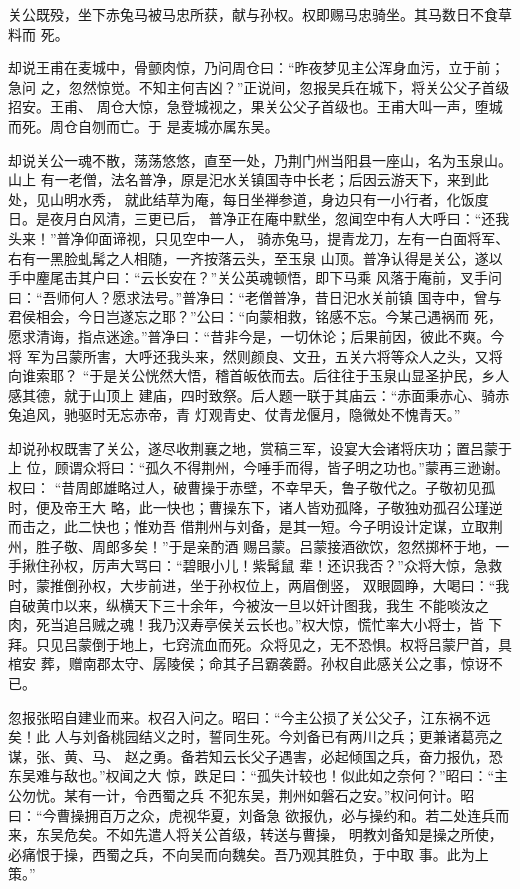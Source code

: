 关公既殁，坐下赤兔马被马忠所获，献与孙权。权即赐马忠骑坐。其马数日不食草料而
死。

却说王甫在麦城中，骨颤肉惊，乃问周仓曰：“昨夜梦见主公浑身血污，立于前；急问
之，忽然惊觉。不知主何吉凶？”正说间，忽报吴兵在城下，将关公父子首级招安。王甫、
周仓大惊，急登城视之，果关公父子首级也。王甫大叫一声，堕城而死。周仓自刎而亡。于
是麦城亦属东吴。

却说关公一魂不散，荡荡悠悠，直至一处，乃荆门州当阳县一座山，名为玉泉山。山上
有一老僧，法名普净，原是汜水关镇国寺中长老；后因云游天下，来到此处，见山明水秀，
就此结草为庵，每日坐禅参道，身边只有一小行者，化饭度日。是夜月白风清，三更已后，
普净正在庵中默坐，忽闻空中有人大呼曰：“还我头来！”普净仰面谛视，只见空中一人，
骑赤兔马，提青龙刀，左有一白面将军、右有一黑脸虬髯之人相随，一齐按落云头，至玉泉
山顶。普净认得是关公，遂以手中麈尾击其户曰：“云长安在？”关公英魂顿悟，即下马乘
风落于庵前，叉手问曰：“吾师何人？愿求法号。”普净曰：“老僧普净，昔日汜水关前镇
国寺中，曾与君侯相会，今日岂遂忘之耶？”公曰：“向蒙相救，铭感不忘。今某己遇祸而
死，愿求清诲，指点迷途。”普净曰：“昔非今是，一切休论；后果前因，彼此不爽。今将
军为吕蒙所害，大呼还我头来，然则颜良、文丑，五关六将等众人之头，又将向谁索耶？
“于是关公恍然大悟，稽首皈依而去。后往往于玉泉山显圣护民，乡人感其德，就于山顶上
建庙，四时致祭。后人题一联于其庙云：“赤面秉赤心、骑赤兔追风，驰驱时无忘赤帝，青
灯观青史、仗青龙偃月，隐微处不愧青天。”

却说孙权既害了关公，遂尽收荆襄之地，赏稿三军，设宴大会诸将庆功；置吕蒙于上
位，顾谓众将曰：“孤久不得荆州，今唾手而得，皆子明之功也。”蒙再三逊谢。权曰：
“昔周郎雄略过人，破曹操于赤壁，不幸早夭，鲁子敬代之。子敬初见孤时，便及帝王大
略，此一快也；曹操东下，诸人皆劝孤降，子敬独劝孤召公瑾逆而击之，此二快也；惟劝吾
借荆州与刘备，是其一短。今子明设计定谋，立取荆州，胜子敬、周郎多矣！”于是亲酌酒
赐吕蒙。吕蒙接酒欲饮，忽然掷杯于地，一手揪住孙权，厉声大骂曰：“碧眼小儿！紫髯鼠
辈！还识我否？”众将大惊，急救时，蒙推倒孙权，大步前进，坐于孙权位上，两眉倒竖，
双眼圆睁，大喝曰：“我自破黄巾以来，纵横天下三十余年，今被汝一旦以奸计图我，我生
不能啖汝之肉，死当追吕贼之魂！我乃汉寿亭侯关云长也。”权大惊，慌忙率大小将士，皆
下拜。只见吕蒙倒于地上，七窍流血而死。众将见之，无不恐惧。权将吕蒙尸首，具棺安
葬，赠南郡太守、孱陵侯；命其子吕霸袭爵。孙权自此感关公之事，惊讶不已。

忽报张昭自建业而来。权召入问之。昭曰：“今主公损了关公父子，江东祸不远矣！此
人与刘备桃园结义之时，誓同生死。今刘备已有两川之兵；更兼诸葛亮之谋，张、黄、马、
赵之勇。备若知云长父子遇害，必起倾国之兵，奋力报仇，恐东吴难与敌也。”权闻之大
惊，跌足曰：“孤失计较也！似此如之奈何？”昭曰：“主公勿忧。某有一计，令西蜀之兵
不犯东吴，荆州如磐石之安。”权问何计。昭曰：“今曹操拥百万之众，虎视华夏，刘备急
欲报仇，必与操约和。若二处连兵而来，东吴危矣。不如先遣人将关公首级，转送与曹操，
明教刘备知是操之所使，必痛恨于操，西蜀之兵，不向吴而向魏矣。吾乃观其胜负，于中取
事。此为上策。”

